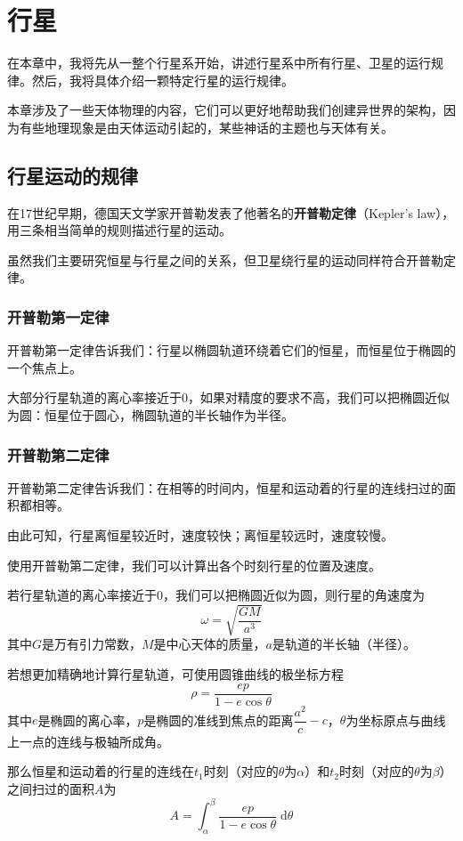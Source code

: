 \chapter{行星}
在本章中，我将先从一整个行星系开始，讲述行星系中所有行星、卫星的运行规律。然后，我将具体介绍一颗特定行星的运行规律。

本章涉及了一些天体物理的内容，它们可以更好地帮助我们创建异世界的架构，因为有些地理现象是由天体运动引起的，某些神话的主题也与天体有关。

\section{行星运动的规律}
在17世纪早期，德国天文学家开普勒发表了他著名的\textbf{开普勒定律}（Kepler's law），用三条相当简单的规则描述行星的运动。

虽然我们主要研究恒星与行星之间的关系，但卫星绕行星的运动同样符合开普勒定律。

\subsection{开普勒第一定律}
开普勒第一定律告诉我们：行星以椭圆轨道环绕着它们的恒星，而恒星位于椭圆的一个焦点上。

大部分行星轨道的离心率接近于0，如果对精度的要求不高，我们可以把椭圆近似为圆：恒星位于圆心，椭圆轨道的半长轴作为半径。

\subsection{开普勒第二定律}
开普勒第二定律告诉我们：在相等的时间内，恒星和运动着的行星的连线扫过的面积都相等。

由此可知，行星离恒星较近时，速度较快；离恒星较远时，速度较慢。

使用开普勒第二定律，我们可以计算出各个时刻行星的位置及速度。

若行星轨道的离心率接近于0，我们可以把椭圆近似为圆，则行星的角速度为\[\omega=\sqrt{\frac{GM}{a^3}}\]其中$G$是万有引力常数，$M$是中心天体的质量，$a$是轨道的半长轴（半径）。

若想更加精确地计算行星轨道，可使用圆锥曲线的极坐标方程\[\rho=\frac{ep}{1-e\cos\theta}\]其中$e$是椭圆的离心率，$p$是椭圆的准线到焦点的距离$\dfrac{a^2}{c}-c$，$\theta$为坐标原点与曲线上一点的连线与极轴所成角。

那么恒星和运动着的行星的连线在$t_1$时刻（对应的$\theta$为$\alpha$）和$t_2$时刻（对应的$\theta$为$\beta$）之间扫过的面积$A$为\[A=\int\nolimits_\alpha^\beta\frac{ep}{1-e\cos\theta}\;\mathrm{d}\theta\]

